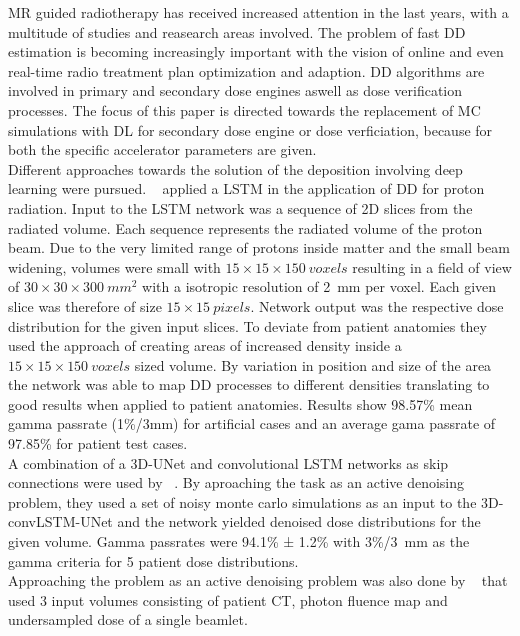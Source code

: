 
MR guided radiotherapy has received increased attention in the last years, with a multitude of studies and reasearch areas involved.
The problem of fast \acs{DD} estimation is becoming increasingly important with the vision of online and even real-time radio treatment plan optimization and adaption.
\acs{DD} algorithms are involved in primary and secondary dose engines aswell as dose verification processes. 
The focus of this paper is directed towards the replacement of \acs{MC} simulations with \acs{DL} for secondary dose engine or dose verficiation, because for both the specific accelerator parameters are given.\\
Different approaches towards the solution of the deposition involving deep learning were pursued. 
\citeauthor{neishabouri_long_2021}~\cite{neishabouri_long_2021} applied a \ac{LSTM} in the application of \acs{DD} for proton radiation.
Input to the \acs{LSTM} network was a sequence of 2D slices from the radiated volume.
Each sequence represents the radiated volume of the proton beam.
Due to the very limited range of protons inside matter and the small beam widening, volumes were small with $15 \times 15 \times 150~voxels$ resulting in a field of view of $30 \times 30 \times 300~mm^2$ with a isotropic resolution of 2~mm per voxel.
Each given slice was therefore of size $15 \times 15~pixels$.
Network output was the respective dose distribution for the given input slices.
To deviate from patient anatomies they used the approach of creating areas of increased density inside a $15 \times 15 \times 150~voxels$ sized volume.
By variation in position and size of the area the network was able to map \acs{DD} processes to different densities translating to good results when applied to patient anatomies.
Results show 98.57\% mean gamma passrate (1\%/3mm) for artificial cases and an average gama passrate of 97.85\% for patient test cases.\\
A combination of a 3D-UNet and convolutional \acs{LSTM} networks as skip connections were used by \citeauthor{de_bruijne_high-particle_2021}~\cite{de_bruijne_high-particle_2021}.
By aproaching the task as an active denoising problem, they used a set of noisy monte carlo simulations as an input to the 3D-convLSTM-UNet and the network yielded denoised dose distributions for the given volume.
Gamma passrates were 94.1\% ± 1.2\% with 3\%/3~mm as the gamma criteria for 5 patient dose distributions.\\
Approaching the problem as an active denoising problem was also done by \citeauthor{neph_deepmcdose_2019}~\cite{neph_deepmcdose_2019} that used 3 input volumes consisting of patient CT, photon fluence map and undersampled dose of a single beamlet.
